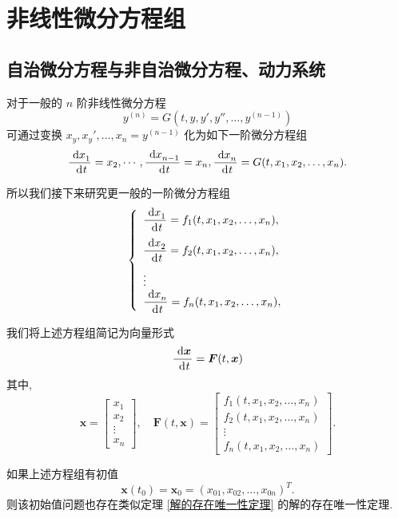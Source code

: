 \chapter{非线性微分方程组}

\section{自治微分方程与非自治微分方程、动力系统}

对于一般的 $n$ 阶非线性微分方程\begin{equation}
	y^{(n)} = G(t,y,y',y'',\ldots,y^{(n-1)})
\end{equation} 可通过变换 $x_y,x_y',\ldots,x_n=y^{(n-1)}$ 化为如下一阶微分方程组 $$\dfrac{\ \text {d} x_1^{}}{\ \text {d}^{} t}=x_2,\cdots,\dfrac{\ \text {d} x_{n-1}^{}}{\ \text {d}^{} t}=x_n,\dfrac{\ \text {d} x_n^{}}{\ \text {d}^{} t}=G(t,x_1,x_2,\ldots,x_n).$$

所以我们接下来研究更一般的一阶微分方程组
\begin{equation}\label{一阶微分方程组}
	\left\{
	\begin{array}{l}
		\dfrac{\ \text {d} x_1^{}}{\ \text {d}^{} t} =f_1(t,x_1,x_2,\ldots,x_n),\\[10pt]
		\dfrac{\ \text {d} x_2^{}}{\ \text {d}^{} t} =f_2(t,x_1,x_2,\ldots,x_n),\\[10pt]
		\vdots \\
		\dfrac{\ \text {d} x_n^{}}{\ \text {d}^{} t} =f_n(t,x_1,x_2,\ldots,x_n),
	\end{array}
	\right.
\end{equation}

我们将上述方程组简记为向量形式 \begin{equation}\label{一阶微分方程组向量}
	\dfrac{\ \text {d} \bm x^{}}{\ \text {d}^{} t}=\bm F(t,\bm x)
\end{equation}
其中,
$$\bm x=\left[\begin{array}{c}
	x_1\\x_2\\\vdots\\x_n
\end{array}\right],\quad \bm F(t,\bm x)=\left[\begin{array}{c}
f_1(t,x_1,x_2,\ldots,x_n)\\f_2(t,x_1,x_2,\ldots,x_n)\\\vdots\\f_n(t,x_1,x_2,\ldots,x_n)
\end{array}\right].$$

如果上述方程组有初值 \begin{equation}\label{微分方程组初始值问题}
	\bm x(t_0)=\bm x_0=(x_{01},x_{02},\ldots,x_{0n})^T.
\end{equation}
则该初始值问题也存在类似定理 \ref{解的存在唯一性定理} 的解的存在唯一性定理.

